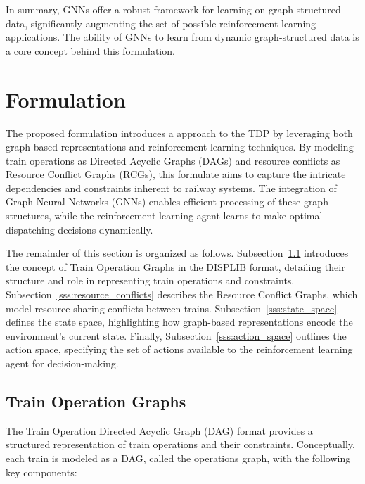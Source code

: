\documentclass[runningheads]{llncs}
\begin{document}
In summary, GNNs offer a robust framework for learning on graph-structured data, significantly augmenting the set of possible reinforcement learning applications.
The ability of GNNs to learn from dynamic graph-structured data is a core concept behind this formulation.

\section{Formulation}
\label{sse:formulation}
The proposed formulation introduces a approach to the TDP by leveraging both graph-based representations and reinforcement learning techniques. 
By modeling train operations as Directed Acyclic Graphs (DAGs) and resource conflicts as Resource Conflict Graphs (RCGs), this formulate aims to capture the intricate dependencies and constraints inherent to railway systems. 
The integration of Graph Neural Networks (GNNs) enables efficient processing of these graph structures, while the reinforcement learning agent learns to make optimal dispatching decisions dynamically. 

The remainder of this section is organized as follows. 
Subsection~\ref{sss:train_ops} introduces the concept of Train Operation Graphs in the DISPLIB format, detailing their structure and role in representing train operations and constraints. 
Subsection~\ref{sss:resource_conflicts} describes the Resource Conflict Graphs, which model resource-sharing conflicts between trains. Subsection~\ref{sss:state_space} defines the state space, highlighting how graph-based representations encode the environment's current state. 
Finally, Subsection~\ref{sss:action_space} outlines the action space, specifying the set of actions available to the reinforcement learning agent for decision-making.

\subsection{Train Operation Graphs}
\label{sss:train_ops}

The Train Operation Directed Acyclic Graph (DAG) format provides a structured representation of train operations and their constraints. Conceptually, each train is modeled as a DAG, called the operations graph, with the following key components:
\end{document}
